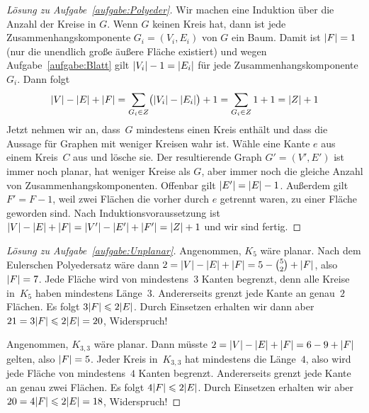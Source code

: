 \begin{proof}[Lösung zu Aufgabe~\ref{aufgabe:Polyeder}]
	Wir machen eine Induktion über die Anzahl der Kreise in $G$. Wenn $G$ keinen Kreis hat, dann ist jede Zusammenhangskomponente $G_i=(V_i,E_i)$ von $G$ ein Baum. Damit ist $\abs*{F}=1$ (nur die unendlich große äußere Fläche existiert) und wegen Aufgabe~\ref{aufgabe:Blatt} gilt $\abs{V_i}-1=\abs{E_i}$ für jede Zusammenhangskomponente $G_i$. Dann folgt
	\begin{equation*}
		\abs*{V}-\abs*{E}+\abs*{F}=\sum_{G_i\in Z}\parens[\big]{\abs{V_i}-\abs{E_i}}+1=\sum_{G_i\in Z}1+1=\abs*{Z}+1
	\end{equation*}
	Jetzt nehmen wir an, dass~$G$ mindestens einen Kreis enthält und dass die Aussage für Graphen mit weniger Kreisen wahr ist. Wähle eine Kante $e$ aus einem Kreis~$C$ aus und lösche sie. Der resultierende Graph $G'=(V',E')$ ist immer noch planar, hat weniger Kreise als $G$, aber immer noch die gleiche Anzahl von Zusammenhangskomponenten. Offenbar gilt $\abs{E'}=\abs{E}-1$. Außerdem gilt $ F' = F-1$, weil zwei Flächen die vorher durch $e$ getrennt waren, zu einer Fläche geworden sind. Nach Induktionsvoraussetzung ist $\abs{V}-\abs{E}+\abs*{F}=\abs{V'}-\abs{E'}+\abs*{F'}=\abs*{Z}+1$ und wir sind fertig.
\end{proof}
\begin{proof}[Lösung zu Aufgabe~\ref{aufgabe:Unplanar}]
	Angenommen, $K_5$ wäre planar. Nach dem Eulerschen Polyedersatz wäre dann $2=\abs{V}-\abs{E}+\abs*{F}=5-\binom{5}{2}+\abs*{F}$, also $\abs*{F}=7$. Jede Fläche wird von mindestens~$3$ Kanten begrenzt, denn alle Kreise in~$K_5$ haben mindestens Länge~$3$. Andererseits grenzt jede Kante an genau~$2$ Flächen. Es folgt $3\abs*{F}\leqslant 2\abs*{E}$. Durch Einsetzen erhalten wir dann aber $21=3\abs*{F}\leqslant 2\abs{E}=20$, Widerspruch!
	
	Angenommen, $K_{3,3}$ wäre planar. Dann müsste $2=\abs{V}-\abs{E}+\abs*{F}=6-9+\abs*{F}$ gelten, also $\abs*{F}=5$. Jeder Kreis in~$K_{3,3}$ hat mindestens die Länge~$4$, also wird jede Fläche von mindestens~$4$ Kanten begrenzt. Andererseits grenzt jede Kante an genau zwei Flächen. Es folgt $4\abs*{F}\leqslant 2\abs{E}$. Durch Einsetzen erhalten wir aber $20=4\abs*{F}\leqslant 2\abs{E}=18$, Widerspruch!
\end{proof}
